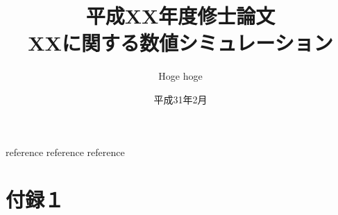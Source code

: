 \documentclass{jreport}
\title{平成XX年度修士論文\\XXに関する数値シミュレーション}
\author{Hoge hoge}
\date{平成31年2月}
\begin{document}
\maketitle
%
\tableofcontents
\listoffigures
\listoftables






\begin{thebibliography}{99}
 reference
 reference
 reference
%
\end{thebibliography}


\appendix
\chapter{付録１}
\end{document}
